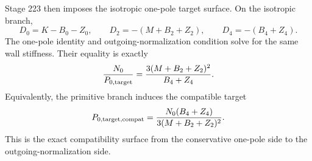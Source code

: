 Stage 223 then imposes the isotropic one-pole target surface.  On the isotropic branch,
\begin{equation}
\label{eq:app-part07-d-coefficients-isotropic}
D_0=K-B_0-Z_0,
\qquad
D_2=-(M+B_2+Z_2),
\qquad
D_4=-(B_4+Z_4).
\end{equation}
The one-pole identity and outgoing-normalization condition solve for the same wall stiffness.  Their equality is exactly
\begin{equation}
\label{eq:app-part07-compatibility-equation}
\frac{N_0}{P_{0,{\rm target}}}
=
\frac{3(M+B_2+Z_2)^2}{B_4+Z_4}.
\end{equation}
Equivalently, the primitive branch induces the compatible target
\begin{equation}
\label{eq:app-part07-compatible-target}
P_{0,{\rm target,compat}}
=
\frac{N_0(B_4+Z_4)}{3(M+B_2+Z_2)^2}.
\end{equation}
This is the exact compatibility surface from the conservative one-pole side to the outgoing-normalization side.

